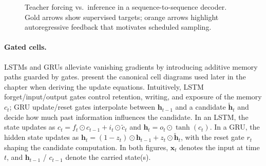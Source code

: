 \begin{figure}[t]
{
}%

\caption{Teacher forcing vs.\ inference in a sequence-to-sequence decoder. Gold arrows show supervised targets; orange arrows highlight autoregressive feedback that motivates scheduled sampling.}
\label{fig:lec7-teacher-forcing}
\end{figure}


\paragraph{Gated cells.} LSTMs \citep{Hochreiter1997,Gers2000} and GRUs \citep{Cho2014} alleviate vanishing gradients by introducing additive memory paths guarded by gates.  present the canonical cell diagrams used later in the chapter when deriving the update equations. Intuitively, LSTM forget/input/output gates control retention, writing, and exposure of the memory \(c_t\); GRU update/reset gates interpolate between \(\mathbf{h}_{t-1}\) and a candidate \(\tilde{\mathbf{h}}_t\) and decide how much past information influences the candidate. In an LSTM, the state updates as \(c_t = f_t \odot c_{t-1} + i_t \odot \tilde c_t\) and \(\mathbf{h}_t = o_t \odot \tanh(c_t)\). In a GRU, the hidden state updates as \(\mathbf{h}_t = (1-z_t)\odot \mathbf{h}_{t-1} + z_t \odot \tilde{\mathbf{h}}_t\), with the reset gate \(r_t\) shaping the candidate computation. In both figures, \(\mathbf{x}_t\) denotes the input at time \(t\), and \(\mathbf{h}_{t-1}\) / \(c_{t-1}\) denote the carried state(s).

